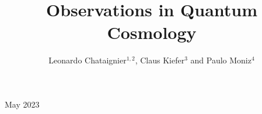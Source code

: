 \documentclass[12pt]{iopart}
\begin{document}
\title[Observations in Quantum Cosmology]{Observations in Quantum Cosmology}
\author{Leonardo Chataignier$^{1,2}$, Claus Kiefer$^3$ and 
Paulo  Moniz$^4$}
\address{$^1$ Dipartimento di Fisica e Astronomia, Universit\`{a} di Bologna,
via Irnerio 46, 40126 Bologna, Italy\\$^2$ I.N.F.N., Sezione di Bologna, I.S. FLAG, viale B. Pichat 6/2, 40127 Bologna, Italy\\$^3$ Faculty of Mathematics and Natural Sciences, Institute for Theoretical Physics, University of Cologne, Cologne, Germany\\$^4$ Departamento de F\'{i}sica,
Centro de Matem\'{a}tica e Aplica\c{c}\~{o}es (CMA-UBI),
Universidade da Beira Interior,
6200-001 Covilh\~{a}, Portugal}
\vspace{10pt}
\begin{indented}
\item[]May 2023
\end{indented}
\end{document}
